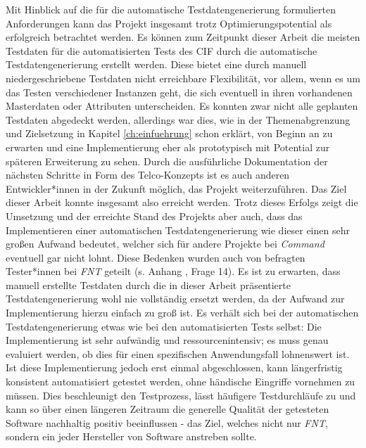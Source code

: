 Mit Hinblick auf die für die automatische Testdatengenerierung formulierten Anforderungen kann das Projekt insgesamt trotz Optimierungspotential als erfolgreich betrachtet werden. Es können zum Zeitpunkt dieser Arbeit die meisten Testdaten für die automatisierten Tests des \ac{CIF} durch die automatische Testdatengenerierung erstellt werden. Diese bietet eine durch manuell niedergeschriebene Testdaten nicht erreichbare Flexibilität, vor allem, wenn es um das Testen verschiedener Instanzen geht, die sich eventuell in ihren vorhandenen Masterdaten oder Attributen unterscheiden. Es konnten zwar nicht alle geplanten Testdaten abgedeckt werden, allerdings war dies, wie in der Themenabgrenzung und Zielsetzung in Kapitel \ref{ch:einfuehrung} schon erklärt, von Beginn an zu erwarten und eine Implementierung eher als prototypisch mit Potential zur späteren Erweiterung zu sehen. Durch die ausführliche Dokumentation der nächsten Schritte in Form des Telco-Konzepts ist es auch anderen Entwickler*innen in der Zukunft möglich, das Projekt weiterzuführen. Das Ziel dieser Arbeit konnte insgesamt also erreicht werden. Trotz dieses Erfolgs zeigt die Umsetzung und der erreichte Stand des Projekts aber auch, dass das Implementieren einer automatischen Testdatengenerierung wie dieser einen sehr großen Aufwand bedeutet, welcher sich für andere Projekte bei \textit{Command} eventuell gar nicht lohnt. Diese Bedenken wurden auch von befragten Tester*innen bei \textit{FNT} geteilt (s. Anhang , Frage 14). Es ist zu erwarten, dass manuell erstellte Testdaten durch die in dieser Arbeit präsentierte Testdatengenerierung wohl nie vollständig ersetzt werden, da der Aufwand zur Implementierung hierzu einfach zu groß ist. Es verhält sich bei der automatischen Testdatengenerierung etwas wie bei den automatisierten Tests selbst: Die Implementierung ist sehr aufwändig und ressourcenintensiv; es muss genau evaluiert werden, ob dies für einen spezifischen Anwendungsfall lohnenswert ist. Ist diese Implementierung jedoch erst einmal abgeschlossen, kann längerfristig konsistent automatisiert getestet werden, ohne händische Eingriffe vornehmen zu müssen. Dies beschleunigt den Testprozess, lässt häufigere Testdurchläufe zu und kann so über einen längeren Zeitraum die generelle Qualität der getesteten Software nachhaltig positiv beeinflussen - das Ziel, welches nicht nur \textit{FNT}, sondern ein jeder Hersteller von Software anstreben sollte.